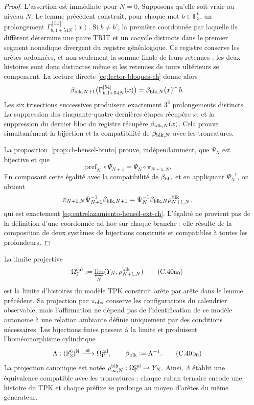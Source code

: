 \begin{proof}
L’assertion est immédiate pour \(N=0\). Supposons qu’elle soit vraie au niveau
\(N\). Le lemme précédent construit, pour chaque mot
\(b\in\mathbb F_3^6\), un prolongement
    \(\Gamma_{b,1+54N}^{[54]}(x)\). Si \(b\ne b'\), la première coordonnée par laquelle
ils diffèrent détermine une paire TRIT et un cocycle distincts dans le premier
segment nonadique divergent du registre généalogique. Ce registre conserve
les arêtes ordonnées, et non seulement la somme finale de leurs retenues ; les deux
histoires sont donc distinctes même si les retenues de tours ultérieurs se
compensent. La lecture directe \eqref{eq:lector-bloques-ch} donne alors
\begin{equation}
 \beta_{{\rm blk},N+1}
 \bigl(\Gamma_{b,1+54N}^{[54]}(x)\bigr)
 =\beta_{{\rm blk},N}(x)^\frown b.
 \label{eq:beta-concatenacion-demostrada-ch}
\end{equation}
Les six trisections successives produisent exactement \(3^6\) prolongements distincts. La suppression des cinquante-quatre dernières étapes récupère \(x\), et la suppression du dernier bloc du registre récupère \(\beta_{{\rm blk},N}(x)\). Cela prouve simultanément la bijection et la compatibilité de \(\beta_{{\rm blk},N}\) avec les troncatures.

La proposition~\ref{prop:ch-hensel-bruto} prouve, indépendamment, que
\(\Psi_N\) est bijective et que
\[
 \operatorname{pref}_N\circ\Psi_{N+1}
 =\Psi_N\circ\pi_{N+1,N}.
\]
En composant cette égalité avec la compatibilité de \(\beta_{\rm blk}\) et en
appliquant \(\Psi_N^{-1}\), on obtient
\[
 \pi_{N+1,N}\Psi_{N+1}^{-1}\beta_{{\rm blk},N+1}
 =\Psi_N^{-1}\beta_{{\rm blk},N}\rho^{\rm blk}_{N+1,N},
\]
qui est exactement \eqref{eq:entrelazamiento-hensel-ext-ch}. L’égalité ne
provient pas de la définition d’une coordonnée ad hoc sur chaque branche : elle résulte de la composition
de deux systèmes de bijections construits et compatibles à toutes les
profondeurs.
\end{proof}

La limite projective
\[
 \Omega_\Gamma^{\rm cal}:=
 \varprojlim_N(Y_N,\rho^{\rm blk}_{N+1,N})
\tag{C.40a$_0$}
\label{eq:omega-gamma-catalogal-ch}
\]
est la limite d'histoires du modèle TPK construit arête par arête dans le lemme précédent. Sa projection par \(\pi_{\rm obs}\) conserve les configurations du calendrier observable, mais l'affirmation ne dépend pas de l'identification de ce modèle autonome à une relation ambiante définie uniquement par des conditions nécessaires. Les bijections finies passent à la limite et produisent l'homéomorphisme cylindrique
\[
 \Lambda:(\mathbb F_3^6)^{\mathbb N}
 \xrightarrow{\ \cong\ }\Omega_\Gamma^{\rm cal},
 \qquad
 \beta_{\rm blk}:=\Lambda^{-1}.
\tag{C.40b$_0$}
\label{eq:homeomorfismo-calibrado-ch}
\]
La projection canonique est notée
\(\rho^{\rm blk}_{\infty,N}:\Omega_\Gamma^{\rm cal}\to Y_N\).
Ainsi, \(\Lambda\) établit une équivalence compatible avec les
troncatures : chaque ruban ternaire encode une histoire du TPK et chaque
préfixe se prolonge au moyen d’arêtes du même générateur.

